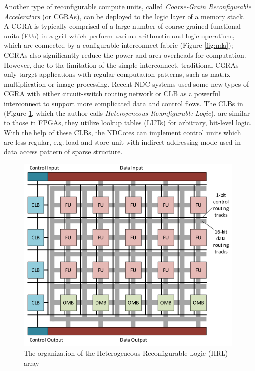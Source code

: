 \documentclass[letterpaper, 11pt, conference, margin=1in]{ieeeconf}   %
\begin{document}
Another type of reconfigurable compute units, called \textit{Coarse-Grain Reconfigurable Accelerators} (or CGRAs), can be deployed to the logic layer of a memory stack. A CGRA is typically comprised of a large number of coarse-grained functional units (FUs) in a grid which perform various arithmetic and logic operations, which are connected by a configurable interconnect fabric (Figure \ref{fig:nda}); CGRAs also significantly reduce the power and area overheads for computation. However, due to the limitation of the simple interconnect, traditional CGRAs only target applications with regular computation patterns, such as matrix multiplication or image processing. Recent NDC systems \cite{7056040, 7446059} used some new types of CGRA with either circuit-switch routing network \cite{7056040} or CLB \cite{7446059} as a powerful interconnect to support more complicated data and control flows. The CLBs in  \cite{7446059} (Figure \ref{fig:hrl}, which the author calls \textit{Heterogeneous Reconfigurable Logic}), are similar to those in FPGAs, they utilize lookup tables (LUTs) for arbitrary, bit-level logic. With the help of these CLBs, the NDCores can implement control units which are less regular, e.g. load and store unit with indirect addressing mode used in data access pattern of sparse structure.

\begin{figure}[h]
  \centering
  \includegraphics[scale=0.35]{figures/hrl.png}
  \caption{The organization of the Heterogeneous Reconfigurable Logic (HRL) array \cite{7446059}}
  \label{fig:hrl}
\end{figure}
\end{document}
